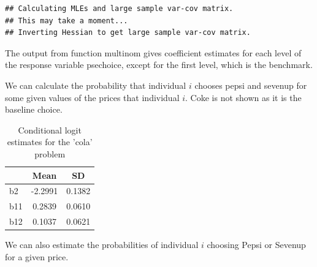 \documentclass[]{book}
\newenvironment{Shaded}{\begin{snugshade}}{\end{snugshade}}
\newcommand{\DataTypeTok}[1]{\textcolor[rgb]{0.13,0.29,0.53}{#1}}
\newcommand{\DecValTok}[1]{\textcolor[rgb]{0.00,0.00,0.81}{#1}}
\newcommand{\KeywordTok}[1]{\textcolor[rgb]{0.13,0.29,0.53}{\textbf{#1}}}
\newcommand{\NormalTok}[1]{#1}
\newcommand{\OperatorTok}[1]{\textcolor[rgb]{0.81,0.36,0.00}{\textbf{#1}}}
\newcommand{\StringTok}[1]{\textcolor[rgb]{0.31,0.60,0.02}{#1}}
\begin{document}
\begin{verbatim}
## Calculating MLEs and large sample var-cov matrix.
## This may take a moment...
## Inverting Hessian to get large sample var-cov matrix.
\end{verbatim}

The output from function multinom gives coefficient estimates for each level of the response variable psechoice, except for the first level, which is the benchmark.

We can calculate the probability that individual \(i\) chooses pepsi and sevenup for some given values of the prices that individual \(i\). Coke is not shown as it is the baseline choice.

\begin{Shaded}
\end{Shaded}

\begin{table}[t]

\caption{\label{tab:unnamed-chunk-159}Conditional logit estimates for the 'cola' problem}
\centering
\begin{tabular}{l|c|c}
\hline
  & Mean & SD\\
\hline
b2 & -2.2991 & 0.1382\\
\hline
b11 & 0.2839 & 0.0610\\
\hline
b12 & 0.1037 & 0.0621\\
\hline
\end{tabular}
\end{table}

We can also estimate the probabilities of individual \(i\) choosing Pepsi or Sevenup for a given price.
\end{document}
